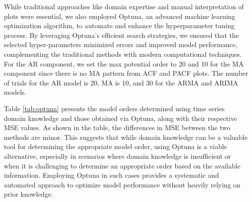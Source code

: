 \documentclass{scrartcl}
\begin{document}
While traditional approaches like domain expertise and manual interpretation of plots were essential, we also employed Optuna, an advanced machine learning optimization algorithm, to automate and enhance the hyperparameter tuning process. By leveraging Optuna's efficient search strategies, we ensured that the selected hyper-parameters minimized errors and improved model performance, complementing the traditional methods with modern computational techniques. For the AR component, we set the max potential order to 20 and 10 for the MA component since there is no MA pattern from ACF and PACF plots. The number of trials for the AR model is 20, MA is 10, and 30 for the ARMA and ARIMA models. 

Table \ref{tab:optuna} presents the model orders determined using time series domain knowledge and those obtained via Optuna, along with their respective MSE values. As shown in the table, the differences in MSE between the two methods are minor. This suggests that while domain knowledge can be a valuable tool for determining the appropriate model order, using Optuna is a viable alternative, especially in scenarios where domain knowledge is insufficient or when it is challenging to determine an appropriate order based on the available information. Employing Optuna in such cases provides a systematic and automated approach to optimize model performance without heavily relying on prior knowledge. 
\end{document}
